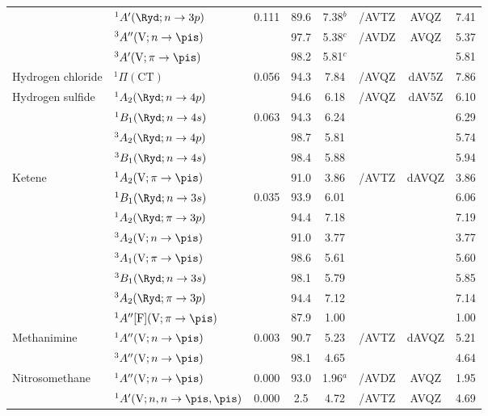 \begin{tabular}{llcccccc}
        &$^1A' (\Ryd;n \rightarrow 3p)$							&0.111	&89.6 &7.38$^b$	&{\CCSDT}/AVTZ& AVQZ		&7.41	\\
        &$^3A'' (\mathrm{V};n \rightarrow \pis)$					&		&97.7 &5.38$^c$	&{\exCI}/AVDZ& AVQZ		&5.37	\\
        &$^3A' (\mathrm{V};\pi \rightarrow \pis)$					&		&98.2 &5.81$^c$	&			&			&5.81	\\
  Hydrogen chloride	 & $^1\Pi (\mathrm{CT})$							&0.056	&94.3 &7.84		& {\exCI}/AVQZ &dAV5Z		&7.86	\\	
  Hydrogen sulfide &$^1A_2 (\Ryd;n \rightarrow 4p)$ 						&		&94.6 &6.18		& {\exCI}/AVQZ &dAV5Z		&6.10	\\
        &$^1B_1 (\Ryd;n \rightarrow 4s)$ 						& 0.063	&94.3 &6.24		&  			&			&6.29	\\
        &$^3A_2 (\Ryd;n \rightarrow 4p)$ 						&		&98.7 &5.81		&  			&			&5.74	\\
        &$^3B_1 (\Ryd;n \rightarrow 4s)$ 						&		&98.4 &5.88		& 			&			&5.94	 \\
  Ketene		&$^1A_2 (\mathrm{V};\pi \rightarrow \pis)$ 				&		&91.0 &3.86		&{\exCI}/AVTZ & dAVQZ		&3.86	\\
        &$^1B_1 (\Ryd;n \rightarrow 3s)$ 						& 0.035	&93.9 &6.01		&			&			&6.06	\\
        &$^1A_2 (\Ryd;\pi \rightarrow 3p)$ 						&		&94.4 &7.18		&			&			&7.19	\\
        &$^3A_2 (\mathrm{V};n \rightarrow \pis)$ 					&		&91.0 &3.77		&			&			&3.77	\\
        &$^3A_1 (\mathrm{V};\pi \rightarrow \pis)$ 				&		&98.6 &5.61		&			&			&5.60	\\
        &$^3B_1 (\Ryd;n \rightarrow 3s)$ 						&		&98.1 &5.79		&			&			&5.85	\\
        &$^3A_2 (\Ryd;\pi \rightarrow 3p)$ 						&		&94.4 &7.12		&			&			&7.14	\\
        &$^1A'' [\mathrm{F}] (\mathrm{V};\pi \rightarrow \pis)$		&		&87.9 &1.00		&			 & 			&1.00	\\
  Methanimine	&$^1A''(\mathrm{V}; n \rightarrow \pis)$ 					&0.003	&90.7 &5.23		&{\exCI}/AVTZ & dAVQZ		&5.21	\\
        &$^3A'' (\mathrm{V}; n \rightarrow \pis)$					&		&98.1 &4.65		&			&			&4.64	\\	
  Nitrosomethane&$^1A'' (\mathrm{V};n \rightarrow \pis)$					& 0.000	&93.0 &1.96$^a$	& {\exCI}/AVDZ & AVQZ		&1.95	 \\
        &$^1A' (\mathrm{V};n,n \rightarrow \pis,\pis)$				&0.000	&2.5	  &4.72		& {\exCI}/AVTZ & AVQZ		& 4.69	\\

\end{tabular}
